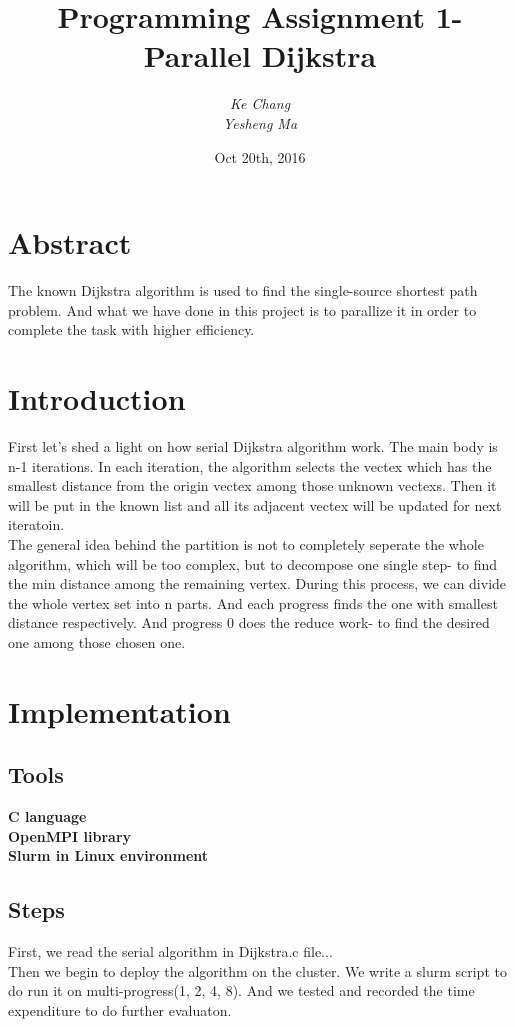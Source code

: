 \documentclass{article}
\begin{document}
\title{Programming Assignment 1- Parallel Dijkstra}
\author{\textit{Ke Chang}\\\textit{Yesheng Ma}}
\date{Oct 20th, 2016}
\maketitle


\section{Abstract}
The known Dijkstra algorithm is used to find the single-source shortest path problem. And what we have done in this project is to parallize it in order to complete the task with higher efficiency.

\section{Introduction}
First let's shed a light on how serial Dijkstra algorithm work. The main body is n-1 iterations. In each iteration, the algorithm selects the vectex which has the smallest distance from the origin vectex among those unknown vectexs. Then it will be put in the known list and all its adjacent vectex will be updated for next iteratoin.\\
The general idea behind the partition is not to completely seperate the whole algorithm, which will be too complex, but to decompose one single step- to find the min distance among the remaining vertex. During this process, we can divide the whole vertex set into n parts. And each progress finds the one with smallest distance respectively. And progress 0 does the reduce work- to find the desired one among those chosen one.  

\section{Implementation}
\subsection{Tools}
\textbf{C language\\OpenMPI library\\Slurm in Linux environment}
\subsection{Steps}
First, we read the serial algorithm in Dijkstra.c file...\\
Then we begin to deploy the algorithm on the cluster. We write a slurm script to do run it on multi-progress(1, 2, 4, 8). And we tested and recorded the time expenditure to do further evaluaton.
\end{document}
